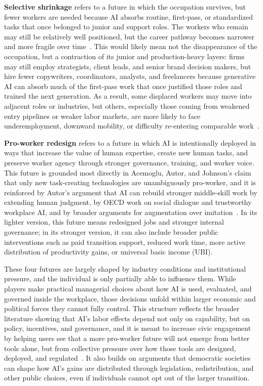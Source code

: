 \documentclass[sigconf,authordraft]{acmart}
\begin{document}
\textbf{Selective shrinkage} refers to a future in which the occupation survives, but fewer workers are needed because AI absorbs routine, first-pass, or standardized tasks that once belonged to junior and support roles. The workers who remain may still be relatively well positioned, but the career pathway becomes narrower and more fragile over time~\cite{acemoglu2026building, acemoglu2019automation, acemoglu2022tasks}. This would likely mean not the disappearance of the occupation, but a contraction of its junior and production-heavy layers: firms may still employ strategists, client leads, and senior brand decision makers, but hire fewer copywriters, coordinators, analysts, and freelancers because generative AI can absorb much of the first-pass work that once justified those roles and trained the next generation. As a result, some displaced workers may move into adjacent roles or industries, but others, especially those coming from weakened entry pipelines or weaker labor markets, are more likely to face underemployment, downward mobility, or difficulty re-entering comparable work~\cite{acemoglu2026building, acemoglu2019automation, rogers2023data}.

\textbf{Pro-worker redesign} refers to a future in which AI is intentionally deployed in ways that increase the value of human expertise, create new human tasks, and preserve worker agency through stronger governance, training, and worker voice. This future is grounded most directly in Acemoglu, Autor, and Johnson's claim that only new task-creating technologies are unambiguously pro-worker, and it is reinforced by Autor's argument that AI can rebuild stronger middle-skill work by extending human judgment, by OECD work on social dialogue and trustworthy workplace AI, and by broader arguments for augmentation over imitation~\cite{acemoglu2026building, autor2024applying, oecd2023employment}. In its lighter version, this future means redesigned jobs and stronger internal governance; in its stronger version, it can also include broader public interventions such as paid transition support, reduced work time, more active distribution of productivity gains, or universal basic income (UBI).

These four futures are largely shaped by industry conditions and institutional pressure, and the individual is only partially able to influence them. While players make practical managerial choices about how AI is used, evaluated, and governed inside the workplace, those decisions unfold within larger economic and political forces they cannot fully control. This structure reflects the broader literature showing that AI's labor effects depend not only on capability, but on policy, incentives, and governance, and it is meant to increase civic engagement by helping users see that a more pro-worker future will not emerge from better tools alone, but from collective pressure over how those tools are designed, deployed, and regulated~\cite{acemoglu2026building, acemoglu2019automation, acemoglu2022tasks, oecd2023employment}. It also builds on arguments that democratic societies can shape how AI's gains are distributed through legislation, redistribution, and other public choices, even if individuals cannot opt out of the larger transition.
\end{document}
